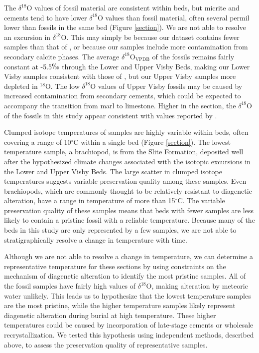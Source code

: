 \documentclass[5p, authoryear]{elsarticle}
\begin{document}
The $\delta^{18}$O values of fossil material are consistent within beds, but micrite and cements tend to have lower $\delta^{18}$O values than fossil material, often several permil lower than fossils in the same bed (Figure \ref{section}). We are not able to resolve an excursion in $\delta^{18}$O. This may simply be because our dataset contains fewer samples than that of \cite{Munnecke2003}, or because our samples include more contamination from secondary calcite phases. The average $\delta^{18}$O$_{\text{VPDB}}$ of the fossils remains fairly constant at -5.5$\permil$ through the Lower and Upper Visby Beds, making our Lower Visby samples consistent with those of \cite{Munnecke2003}, but our Upper Visby samples more depleted in $^{18}$O. The low $\delta^{18}$O values of Upper Visby fossils may be caused by increased contamination from secondary cements, which could be expected to accompany the transition from marl to limestone. Higher in the section, the $\delta^{18}$O of the fossils in this study appear consistent with values reported by \cite{Bickert1997}. 

Clumped isotope temperatures of samples are highly variable within beds, often covering a range of 10$^{\circ}$C within a single bed (Figure \ref{section}). The lowest temperature sample, a brachiopod, is from the Slite Formation, deposited well after the hypothesized climate changes associated with the isotopic excursions in the Lower and Upper Visby Beds. The large scatter in clumped isotope temperatures suggests variable preservation quality among these samples. Even brachiopods, which are commonly thought to be relatively resistant to diagenetic alteration, have a range in temperature of more than 15$^{\circ}$C. The variable preservation quality of these samples means that beds with fewer samples are less likely to contain a pristine fossil with a reliable temperature. Because many of the beds in this study are only represented by a few samples, we are not able to stratigraphically resolve a change in temperature with time. 

Although we are not able to resolve a change in temperature, we can determine a representative temperature for these sections by using constraints on the mechanism of diagenetic alteration to identify the most pristine samples. All of the fossil samples have fairly high values of $\delta^{18}$O, making alteration by meteoric water unlikely. This leads us to hypothesize that the lowest temperature samples are the most pristine, while the higher temperature samples likely represent diagenetic alteration during burial at high temperature. These higher temperatures could be caused by incorporation of late-stage cements or wholesale recrystallization. We tested this hypothesis using independent methods, described above, to assess the preservation quality of representative samples. 
\end{document}
